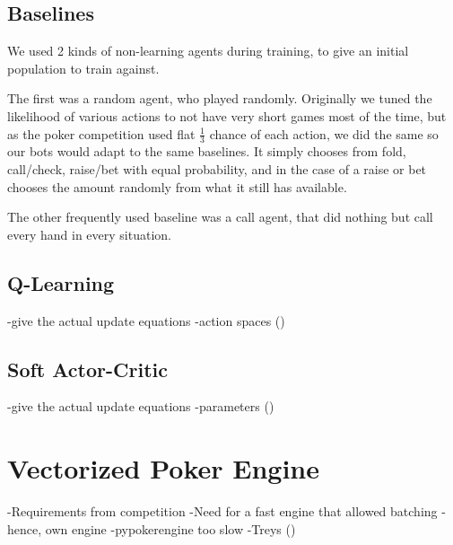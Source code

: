 \subsection{Baselines}
We used 2 kinds of non-learning agents during training, to give an initial population to train against.

The first was a random agent, who played randomly. Originally we tuned the likelihood of various actions to not have very short games most of the time, but as the poker competition used flat $\frac{1}{3}$ chance of each action, we did the same so our bots would adapt to the same baselines. It simply chooses from {fold, call/check, raise/bet} with equal probability, and in the case of a raise or bet chooses the amount randomly from what it still has available.

The other frequently used baseline was a call agent, that did nothing but call every hand in every situation.

\subsection{Q-Learning}
-give the actual update equations
-action spaces
(\cite{SpinningUp2018})

\subsection{Soft Actor-Critic}
\cite{SAC_main}
-give the actual update equations
-parameters
(\cite{SpinningUp2018})


\section{Vectorized Poker Engine}
-Requirements from competition
-Need for a fast engine that allowed batching
    -hence, own engine
-pypokerengine too slow
-Treys (\cite{Treys})